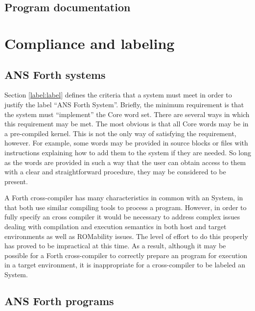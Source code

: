 \subsection{Program documentation} %

\section{Compliance and labeling} %

\subsection{ANS Forth systems} %

Section \ref{label:label} defines the criteria that a system must
meet in order to justify the label ``ANS Forth System''. Briefly,
the minimum requirement is that the system must ``implement'' the
Core word set. There are several ways in which this requirement may
be met. The most obvious is that all Core words may be in a pre-compiled
kernel. This is not the only way of satisfying the requirement,
however. For example, some words may be provided in source blocks or
files with instructions explaining how to add them to the system if
they are needed. So long as the words are provided in such a way that
the user can obtain access to them with a clear and straightforward
procedure, they may be considered to be present.

A Forth cross-compiler has many characteristics in common with an 
System, in that both use similar compiling tools to process a
program. However, in order to fully specify an  cross compiler
it would be necessary to address complex issues dealing with compilation
and execution semantics in both host and target environments as well as
ROMability issues. The level of effort to do this properly has proved to
be impractical at this time. As a result, although it may be possible
for a Forth cross-compiler to correctly prepare an  program
for execution in a target environment, it is inappropriate for a
cross-compiler to be labeled an  System.

\subsection{ANS Forth programs} %

\setcounter{subsubsection}{1}
